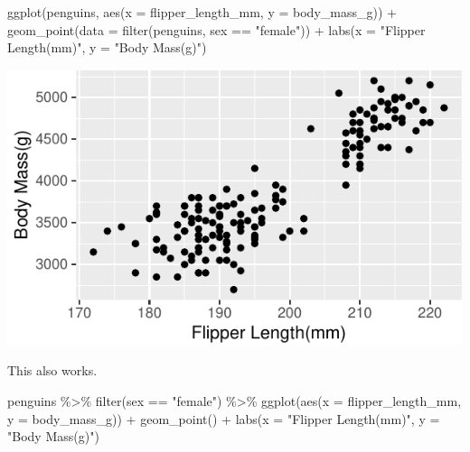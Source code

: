 \documentclass[]{tufte-handout}
\newenvironment{Shaded}{}{}
\newcommand{\AttributeTok}[1]{\textcolor[rgb]{0.49,0.56,0.16}{#1}}
\newcommand{\FunctionTok}[1]{\textcolor[rgb]{0.02,0.16,0.49}{#1}}
\newcommand{\NormalTok}[1]{#1}
\newcommand{\SpecialCharTok}[1]{\textcolor[rgb]{0.25,0.44,0.63}{#1}}
\newcommand{\StringTok}[1]{\textcolor[rgb]{0.25,0.44,0.63}{#1}}
\begin{document}
\begin{Shaded}
\begin{Highlighting}[]
\FunctionTok{ggplot}\NormalTok{(penguins, }\FunctionTok{aes}\NormalTok{(}\AttributeTok{x =}\NormalTok{ flipper\_length\_mm, }\AttributeTok{y =}\NormalTok{ body\_mass\_g)) }\SpecialCharTok{+}
  \FunctionTok{geom\_point}\NormalTok{(}\AttributeTok{data =} \FunctionTok{filter}\NormalTok{(penguins, sex }\SpecialCharTok{==} \StringTok{"female"}\NormalTok{)) }\SpecialCharTok{+}
  \FunctionTok{labs}\NormalTok{(}\AttributeTok{x =} \StringTok{"Flipper Length(mm)"}\NormalTok{, }\AttributeTok{y =} \StringTok{"Body Mass(g)"}\NormalTok{)}
\end{Highlighting}
\end{Shaded}

\begin{center}\includegraphics{R-Guide_files/figure-latex/female-plot-1} \end{center}

This also works.

\begin{Shaded}
\begin{Highlighting}[]
\NormalTok{penguins }\SpecialCharTok{\%\textgreater{}\%}
  \FunctionTok{filter}\NormalTok{(sex }\SpecialCharTok{==} \StringTok{"female"}\NormalTok{) }\SpecialCharTok{\%\textgreater{}\%}
  \FunctionTok{ggplot}\NormalTok{(}\FunctionTok{aes}\NormalTok{(}\AttributeTok{x =}\NormalTok{ flipper\_length\_mm, }\AttributeTok{y =}\NormalTok{ body\_mass\_g)) }\SpecialCharTok{+}
  \FunctionTok{geom\_point}\NormalTok{() }\SpecialCharTok{+}
  \FunctionTok{labs}\NormalTok{(}\AttributeTok{x =} \StringTok{"Flipper Length(mm)"}\NormalTok{, }\AttributeTok{y =} \StringTok{"Body Mass(g)"}\NormalTok{)}
\end{Highlighting}
\end{Shaded}
\end{document}
